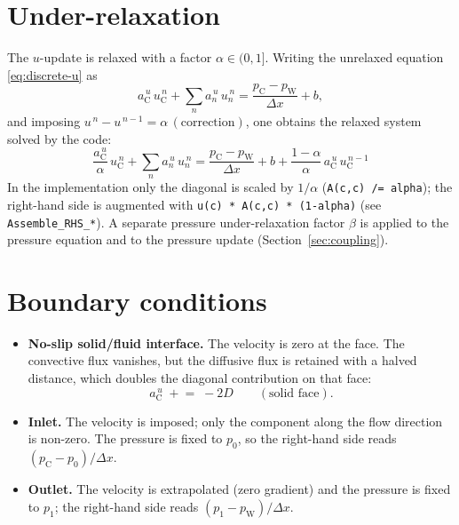 \documentclass[11pt,a4paper]{article}
\newcommand{\cw}{\mathrm{W}}
\newcommand{\cc}{\mathrm{C}}
\begin{document}
\section{Under-relaxation}

The $u$-update is relaxed with a factor $\alpha\in(0,1]$.  Writing the
unrelaxed equation \eqref{eq:discrete-u} as
\begin{equation}
a^{\,u}_{\cc}\,u_{\cc}^{\,n}+\sum_{n}a^{\,u}_{n}\,u_{n}^{\,n}
=\frac{p_{\cc}-p_{\cw}}{\Delta x}+b ,
\end{equation}
and imposing $u^{\,n}-u^{\,n-1}=\alpha\,(\text{correction})$, one obtains
the relaxed system solved by the code:
\begin{equation}
\boxed{\;
\frac{a^{\,u}_{\cc}}{\alpha}\,u_{\cc}^{\,n}+\sum_{n}a^{\,u}_{n}\,u_{n}^{\,n}
=\frac{p_{\cc}-p_{\cw}}{\Delta x}+b
+\frac{1-\alpha}{\alpha}\,a^{\,u}_{\cc}\,u_{\cc}^{\,n-1}
\;}
\label{eq:relaxed}
\end{equation}
In the implementation only the diagonal is scaled by $1/\alpha$
(\texttt{A(c,c) /= alpha}); the right-hand side is augmented with
\texttt{u(c) * A(c,c) * (1-alpha)} (see
\texttt{Assemble\_RHS\_*}).  A separate pressure under-relaxation factor
$\beta$ is applied to the pressure equation and to the pressure update
(Section~\ref{sec:coupling}).

\section{Boundary conditions}

\begin{itemize}[leftmargin=1.5em]
\item \textbf{No-slip solid/fluid interface.}  The velocity is zero at the
  face.  The convective flux vanishes, but the diffusive flux is retained with
  a halved distance, which doubles the diagonal contribution on that face:
  \begin{equation}
  a^{\,u}_{\cc}\;\mathrel{+}=\;-2D
  \qquad(\text{solid face}).
  \end{equation}

\item \textbf{Inlet.}  The velocity is imposed; only the component along the
  flow direction is non-zero.  The pressure is fixed to $p_{0}$, so the
  right-hand side reads $(p_{\cc}-p_{0})/\Delta x$.

\item \textbf{Outlet.}  The velocity is extrapolated (zero gradient) and the
  pressure is fixed to $p_{1}$; the right-hand side reads
  $(p_{1}-p_{\cw})/\Delta x$.
\end{itemize}
\end{document}
